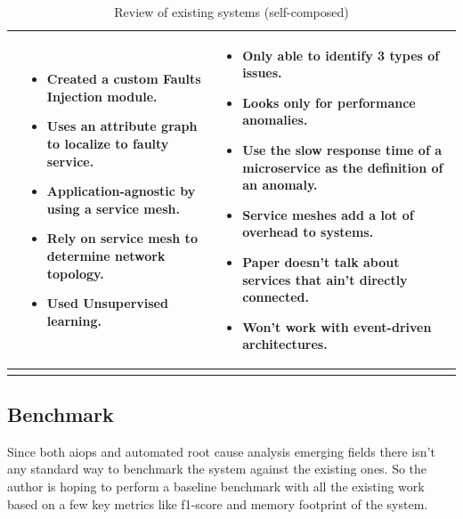 \begin{longtable}{| p{25mm} | p{62mm} | p{62mm} |}
    \cite{wu2020microrca} &
    \vspace{-8mm}
    \begin{itemize}[leftmargin=3mm,noitemsep,nolistsep] 
        \item Created a custom Faults Injection module.
        \item Uses an attribute graph to localize to faulty service.
        \item Application-agnostic by using a service mesh.
        \item Rely on service mesh to determine network topology.
        \item Used Unsupervised learning.
        \vspace{-7mm}
    \end{itemize} &
    \vspace{-8mm}
    \begin{itemize}[leftmargin=3mm,noitemsep,nolistsep] 
        \item Only able to identify 3 types of issues.
        \item Looks only for performance anomalies.
        \item Use the slow response time of a microservice as the definition of an anomaly.
        \item Service meshes add a lot of overhead to systems.
        \item Paper doesn't talk about services that ain't directly connected.
        \item Won't work with event-driven architectures.
        \vspace{-7mm}
    \end{itemize} \\ \hline
    
    \caption{Review of existing systems (self-composed)}
\end{longtable}


\subsection{Benchmark}
Since both \ac{aiops} and automated root cause analysis emerging fields  there isn't any standard way to benchmark the system against the existing ones. So the author is hoping to perform a baseline benchmark with all the existing work based on a few key metrics like f1-score and memory footprint of the system.